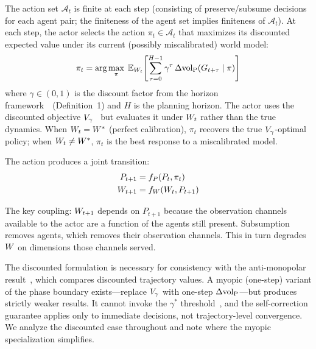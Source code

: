 \begin{definition}
\label{def:transition}
The action set $\mathcal{A}_t$ is finite at each step (consisting of
preserve/subsume decisions for each agent pair; the finiteness of the
agent set implies finiteness of $\mathcal{A}_t$).  At each step, the
actor selects the action $\pi_t \in \mathcal{A}_t$ that maximizes its
discounted expected value under its current (possibly miscalibrated)
world model:
\begin{equation}
\label{eq:locally_rational}
\pi_t = \arg\max_{\pi} \;
  \mathbb{E}_{W_t}\!\left[
    \sum_{\tau=0}^{H-1} \gamma^\tau \,
    \Delta{\operatorname{vol}_{\mathrm{P}}}(G_{t+\tau} \mid \pi)
  \right]
\end{equation}
where $\gamma \in (0,1)$ is the discount factor from
the horizon framework~\citep{lasser2026horizon}~(Definition~1) and $H$ is the planning horizon.  The actor
uses the discounted objective $V_\gamma$~\citep{lasser2026horizon} but evaluates it under
$W_t$ rather than the true dynamics.  When $W_t = W^*$
(perfect calibration), $\pi_t$ recovers the true
$V_\gamma$-optimal policy; when $W_t \neq W^*$, $\pi_t$ is the
best response to a miscalibrated model.
\end{definition}

The action produces a joint transition:
\begin{align}
P_{t+1} &= f_P(P_t, \pi_t) \label{eq:poset_transition} \\
W_{t+1} &= f_{W}(W_t, P_{t+1}) \label{eq:wm_transition}
\end{align}

The key coupling: $W_{t+1}$ depends on $P_{t+1}$ because the
observation channels available to the actor are a function of the
agents still present.  Subsumption removes agents, which removes
their observation channels.  This in turn degrades $W$ on
dimensions those channels served.

\begin{remark}
\label{rem:myopic}
The discounted formulation is necessary for consistency with the
anti-monopolar result~\citep[Proposition~6]{lasser2026horizon}, which
compares discounted trajectory values.  A myopic (one-step) variant of
the phase boundary exists---replace $V_\gamma$ with one-step
$\Delta{\operatorname{vol}_{\mathrm{P}}}$---but produces strictly weaker results.  It cannot
invoke the $\gamma^*$ threshold~\citep{lasser2026horizon}, and the
self-correction guarantee applies only to immediate decisions, not
trajectory-level convergence.  We analyze the discounted case
throughout and note where the myopic specialization simplifies.
\end{remark}

